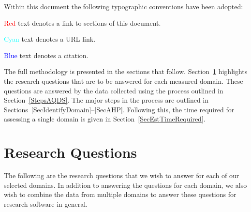 \documentclass[letterpaper,cleveref]{lipics-v2019}
\begin{document}
Within this document the following typographic conventions have been adopted:
\begin{inparaenum}[i)] 
  \item \textcolor{red}{Red} text denotes a link to sections of this document. 
  \item \textcolor{cyan}{Cyan} text denotes a URL link.
  \item \textcolor{blue}{Blue} text denotes a citation.
\end{inparaenum}

The full methodology is presented in the sections that follow.
Section~\ref{SecResearchQuestions} highlights the research questions that are to
be answered for each measured domain. These questions are answered by the data
collected using the process outlined in Section~\ref{StepsAQDS}.  The major
steps in the process are outlined in
Sections~\ref{SecIdentifyDomain}--\ref{SecAHP}.  Following this, the time
required for assessing a single domain is given in
Section~\ref{SecEstTimeRequired}.

\section{Research Questions} \label{SecResearchQuestions}

The following are the research questions that we wish to answer for each of our
selected domains.  In addition to answering the questions for each domain, we
also wish to combine the data from multiple domains to answer these questions
for research software in general.
\end{document}
